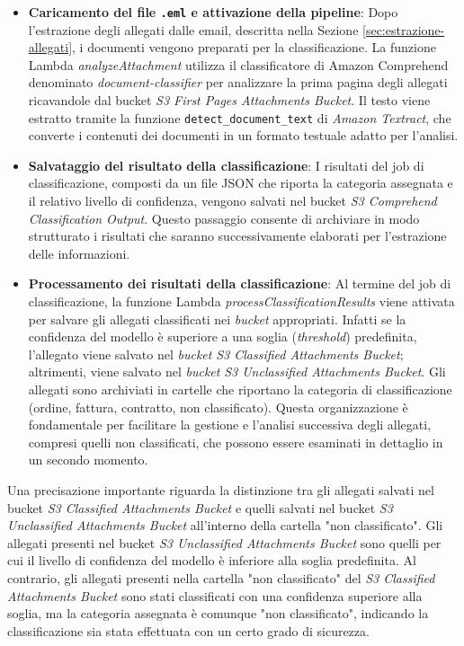 \begin{itemize}
    \item \textbf{Caricamento del file \texttt{.eml} e attivazione della pipeline}: Dopo l'estrazione degli allegati dalle email, descritta nella Sezione \ref{sec:estrazione-allegati}, i documenti vengono preparati per la classificazione. La funzione Lambda \emph{analyzeAttachment} utilizza il classificatore di Amazon Comprehend denominato 
    \emph{document-classifier} per analizzare la prima pagina degli allegati ricavandole dal bucket \emph{S3 First Pages Attachments Bucket}. Il testo viene estratto tramite la funzione \texttt{detect\_document\_text} di \emph{Amazon Textract}, che converte i contenuti dei documenti in un formato testuale adatto per l'analisi.

    \item \textbf{Salvataggio del risultato della classificazione}: I risultati del job di classificazione, composti da un file JSON che riporta la categoria assegnata e il relativo livello di confidenza, vengono salvati nel bucket \emph{S3 Comprehend Classification Output}. Questo passaggio consente di archiviare in modo strutturato i risultati che saranno successivamente elaborati per l'estrazione delle informazioni.

    \item \textbf{Processamento dei risultati della classificazione}: Al termine del job di classificazione, la funzione Lambda \emph{processClassificationResults} viene attivata per salvare gli allegati classificati nei \emph{bucket} appropriati. Infatti se la confidenza del modello è superiore a una soglia (\textit{threshold}) predefinita, l'allegato viene salvato nel \emph{bucket} \emph{S3 Classified Attachments Bucket}; altrimenti, viene salvato nel \emph{bucket} \emph{S3 Unclassified Attachments Bucket}. Gli allegati sono archiviati in cartelle che riportano la categoria di classificazione (ordine, fattura, contratto, non classificato). Questa organizzazione è fondamentale per facilitare la gestione e l'analisi successiva degli allegati, compresi quelli non classificati, che possono essere esaminati in dettaglio in un secondo momento.
\end{itemize}

Una precisazione importante riguarda la distinzione tra gli allegati salvati nel bucket \emph{S3 Classified Attachments Bucket} e quelli salvati nel bucket \emph{S3 Unclassified Attachments Bucket} 
all'interno della cartella "non classificato". Gli allegati presenti nel bucket \emph{S3 Unclassified Attachments Bucket} sono quelli per cui il livello di confidenza del modello è inferiore alla soglia predefinita. Al contrario, gli allegati presenti nella cartella "non classificato" del \emph{S3 Classified Attachments Bucket} sono stati classificati con una confidenza superiore alla soglia, ma la categoria assegnata è comunque "non classificato", indicando la classificazione sia stata effettuata con un certo grado di sicurezza.
